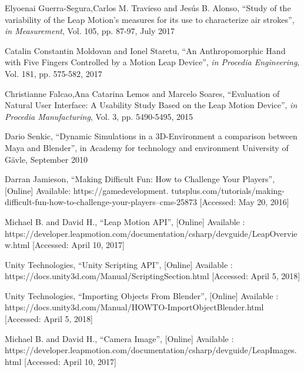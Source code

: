 \documentclass[journal]{IEEEtran}										    %
\begin{document}
        
        \begin{thebibliography}{1}

                Elyoenai Guerra-Segura,Carlos M. Travieso and Jesús B. Alonso, “Study of the 
                variability of the Leap Motion’s measures for its use to characterize air strokes”, 
                \emph{in Measurement}, Vol. 105, pp. 87-97, July 2017
                
                
                Catalin Constantin Moldovan and Ionel Staretu, “An Anthropomorphic Hand with Five 
                Fingers Controlled by a Motion Leap Device”, \emph{in Procedia Engineering}, Vol. 181, 
                pp. 575-582, 2017
                

                Christianne Falcao,Ana Catarina Lemos and Marcelo Soares, “Evaluation of Natural User 
                Interface: A Usability Study Based on the Leap Motion Device”, 
                \emph{in Procedia Manufacturing}, Vol. 3, pp. 5490-5495, 2015
            
                Dario Senkic, “Dynamic Simulations in a 3D-Environment a comparison between Maya
                and Blender”, in Academy for technology and environment University of Gävle, 
                September 2010

                Darran Jamieson, “Making Difficult Fun: How to Challenge Your Players”, [Online]
                Available: https://gamedevelopment.
                tutsplus.com/tutorials/making-difficult-fun-how-to-challenge-your-players--cms-25873 [Accessed: May 20, 2016]
            
                Michael B. and David H., “Leap Motion API”, [Online] Available :
                https://developer.leapmotion.com/documentation/csharp/devguide/Leap\textunderscore Overview.html 
                [Accessed: April 10, 2017]

                Unity Technologies, “Unity Scripting API”, [Online] Available :
                https://docs.unity3d.com/Manual/ScriptingSection.html [Accessed: April 5, 2018]
            
                Unity Technologies, “Importing Objects From Blender”, [Online] Available : 
                https://docs.unity3d.com/Manual/HOWTO-ImportObjectBlender.html [Accessed: 
                April 5, 2018]
            
                Michael B. and David H., “Camera Image”, [Online] Available : 
                https://developer.leapmotion.com/documentation/csharp/devguide/Leap\textunderscore Images.html 
                [Accessed: April 10, 2017]

        \end{thebibliography}
\end{document}
